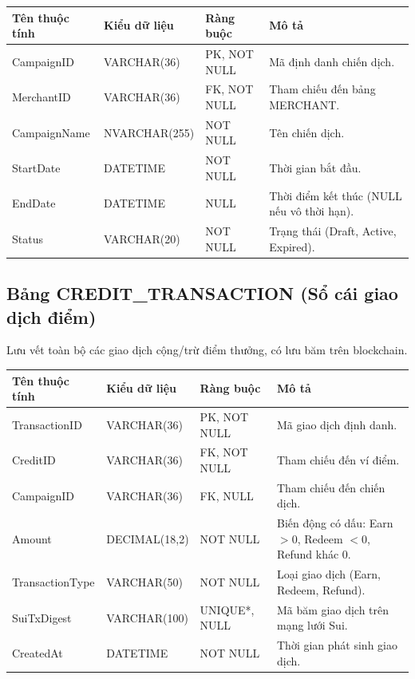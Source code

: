 \begin{table}[H]
    \centering
    \renewcommand{\arraystretch}{1.3}
    \begin{tabular}{|>{\raggedright\arraybackslash}p{3cm}|>{\raggedright\arraybackslash}p{3.2cm}|>{\raggedright\arraybackslash}p{2.5cm}|>{\raggedright\arraybackslash}p{5.5cm}|}
        \hline
        \textbf{Tên thuộc tính} & \textbf{Kiểu dữ liệu} & \textbf{Ràng buộc} & \textbf{Mô tả} \\ \hline
        CampaignID & VARCHAR(36) & PK, NOT NULL & Mã định danh chiến dịch. \\ \hline
        MerchantID & VARCHAR(36) & FK, NOT NULL & Tham chiếu đến bảng MERCHANT. \\ \hline
        CampaignName & NVARCHAR(255) & NOT NULL & Tên chiến dịch. \\ \hline
        StartDate & DATETIME & NOT NULL & Thời gian bắt đầu. \\ \hline
        EndDate & DATETIME & NULL & Thời điểm kết thúc (NULL nếu vô thời hạn). \\ \hline
        Status & VARCHAR(20) & NOT NULL & Trạng thái (Draft, Active, Expired). \\ \hline
    \end{tabular}
\end{table}

\subsection{Bảng CREDIT\_TRANSACTION (Sổ cái giao dịch điểm)}
Lưu vết toàn bộ các giao dịch cộng/trừ điểm thưởng, có lưu băm trên blockchain.

\begin{table}[H]
    \centering
    \renewcommand{\arraystretch}{1.3}
    \begin{tabular}{|>{\raggedright\arraybackslash}p{3cm}|>{\raggedright\arraybackslash}p{3.2cm}|>{\raggedright\arraybackslash}p{2.5cm}|>{\raggedright\arraybackslash}p{5.5cm}|}
        \hline
        \textbf{Tên thuộc tính} & \textbf{Kiểu dữ liệu} & \textbf{Ràng buộc} & \textbf{Mô tả} \\ \hline
        TransactionID & VARCHAR(36) & PK, NOT NULL & Mã giao dịch định danh. \\ \hline
        CreditID & VARCHAR(36) & FK, NOT NULL & Tham chiếu đến ví điểm. \\ \hline
        CampaignID & VARCHAR(36) & FK, NULL & Tham chiếu đến chiến dịch. \\ \hline
        Amount & DECIMAL(18,2) & NOT NULL & Biến động có dấu: Earn $>0$, Redeem $<0$, Refund khác 0. \\ \hline
        TransactionType & VARCHAR(50) & NOT NULL & Loại giao dịch (Earn, Redeem, Refund). \\ \hline
        SuiTxDigest & VARCHAR(100) & UNIQUE*, NULL & Mã băm giao dịch trên mạng lưới Sui. \\ \hline
        CreatedAt & DATETIME & NOT NULL & Thời gian phát sinh giao dịch. \\ \hline
    \end{tabular}
\end{table}

